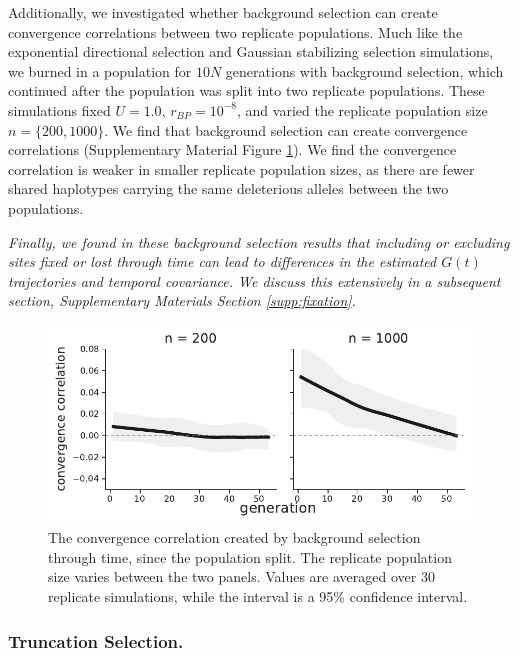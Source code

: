 \documentclass[11pt]{article}
\newcommand{\vb}[1]{{\it \color{blue} #1}}
\begin{document}
Additionally, we investigated whether background selection can create
convergence correlations between two replicate populations. Much like the
exponential directional selection and Gaussian stabilizing selection
simulations, we burned in a population for $10N$ generations with background
selection, which continued after the population was split into two replicate
populations. These simulations fixed $U = 1.0$, $r_{BP} = 10^{-8}$, and varied
the replicate population size $n = \{200, 1000\}$. We find that background
selection can create convergence correlations (Supplementary Material Figure
\ref{suppfig:supp-bgs-converg}). We find the convergence correlation is weaker
in smaller replicate population sizes, as there are fewer shared haplotypes
carrying the same deleterious alleles between the two populations.

\vb{Finally, we found in these background selection results that including or
excluding sites fixed or lost through time can lead  to differences in the
estimated $G(t)$ trajectories and temporal covariance. We discuss this extensively in a
subsequent section, Supplementary Materials Section \ref{supp:fixation}.}

\begin{figure}[!ht]
  \centering
  \includegraphics[width=\textwidth]{figures/fig-bgs-convergence-correlation.pdf}

  \caption{The convergence correlation created by background selection through
    time, since the population split. The replicate population size varies
    between the two panels. Values are averaged over 30 replicate simulations,
    while the interval is a 95\% confidence interval.}

  \label{suppfig:supp-bgs-converg}
\end{figure}


\subsubsection{Truncation Selection.} 
\end{document}
